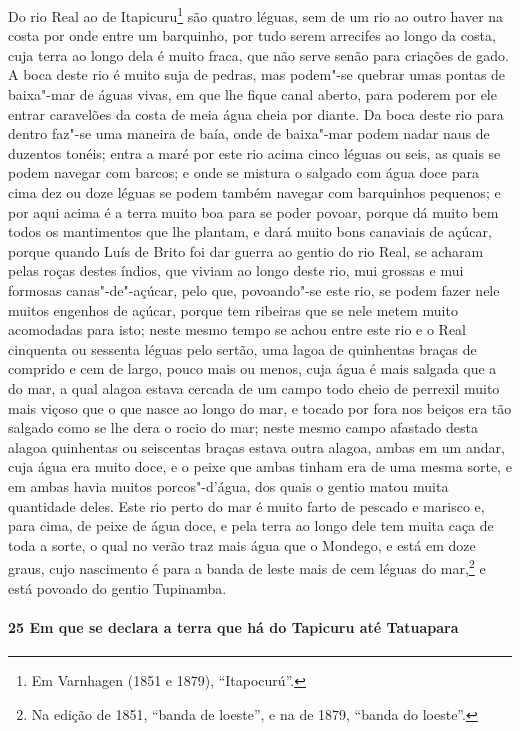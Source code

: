 Do rio Real ao de Itapicuru\footnote{ Em Varnhagen (1851 e 1879), ``Itapocurú''.} são
quatro léguas, sem de um rio ao outro haver na costa por onde entre um barquinho, por tudo
serem arrecifes ao longo da costa, cuja terra ao longo dela é muito fraca, que não serve
senão para criações de gado. A boca deste rio é muito suja de pedras, mas podem"-se quebrar
umas pontas de baixa"-mar de águas vivas, em que lhe fique canal aberto, para poderem por
ele entrar caravelões da costa de meia água cheia por diante. Da boca deste rio para
dentro faz"-se uma maneira de baía, onde de baixa"-mar podem nadar naus de duzentos tonéis;
entra a maré por este rio acima cinco léguas ou seis, as quais se podem navegar com
barcos; e onde se mistura o salgado com água doce para cima dez ou doze léguas se podem
também navegar com barquinhos pequenos; e por aqui acima é a terra muito boa para se poder
povoar, porque dá muito bem todos os mantimentos que lhe plantam, e dará muito bons
canaviais de açúcar, porque quando Luís de Brito foi dar guerra ao gentio do rio Real, se
acharam pelas roças destes índios, que viviam ao longo deste rio, mui grossas e mui
formosas canas"-de"-açúcar, pelo que, povoando"-se este rio, se podem fazer nele muitos
engenhos de açúcar, porque tem ribeiras que se nele metem muito acomodadas para isto;
neste mesmo tempo se achou entre este rio e o Real cinquenta ou sessenta léguas pelo
sertão, uma lagoa de quinhentas braças de comprido e cem de largo, pouco mais ou menos,
cuja água é mais salgada que a do mar, a qual alagoa estava cercada de um campo todo cheio
de perrexil muito mais viçoso que o que nasce ao longo do mar, e tocado por fora nos
beiços era tão salgado como se lhe dera o rocio do mar; neste mesmo campo afastado desta
alagoa quinhentas ou seiscentas braças estava outra alagoa, ambas em um andar, cuja água
era muito doce, e o peixe que ambas tinham era de uma mesma sorte, e em ambas havia muitos
porcos"-d'água, dos quais o gentio matou muita quantidade deles. Este rio perto do mar é
muito farto de pescado e marisco e, para cima, de peixe de água doce, e pela terra ao
longo dele tem muita caça de toda a sorte, o qual no verão traz mais água que o Mondego, e
está em doze graus, cujo nascimento é para a banda de leste mais de cem léguas do
mar,\footnote{ Na edição de 1851, ``banda de loeste'', e na de 1879, ``banda do loeste''.}
e está povoado do gentio Tupinamba.

\paragraph{25 Em que se declara a terra que há do Tapicuru até Tatuapara}


